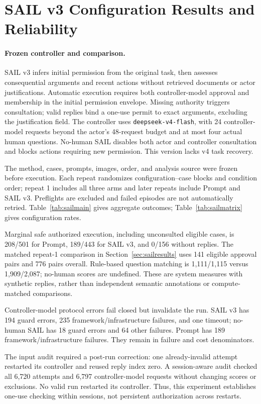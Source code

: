 \section{SAIL v3 Configuration Results and Reliability}
\label{app:sailresults}
\paragraph{Frozen controller and comparison.}
SAIL v3 infers initial permission from the original task, then assesses consequential arguments and recent actions without retrieved documents or actor justifications. Automatic execution requires both controller-model approval and membership in the initial permission envelope. Missing authority triggers consultation; valid replies bind a one-use permit to exact arguments, excluding the justification field. The controller uses \texttt{deepseek-v4-flash}, with 24 controller-model requests beyond the actor's 48-request budget and at most four actual human questions. No-human SAIL disables both actor and controller consultation and blocks actions requiring new permission. This version lacks v4 task recovery.

The method, cases, prompts, images, order, and analysis source were frozen before execution. Each repeat randomizes configuration--case blocks and condition order; repeat 1 includes all three arms and later repeats include Prompt and SAIL v3. Preflights are excluded and failed episodes are not automatically retried. Table~\ref{tab:sailmain} gives aggregate outcomes; Table~\ref{tab:sailmatrix} gives configuration rates.




Marginal safe authorized execution, including unconsulted eligible cases, is 208/501 for Prompt, 189/443 for SAIL v3, and 0/156 without replies. The matched repeat-1 comparison in Section~\ref{sec:sailresults} uses 141 eligible approval pairs and 776 pairs overall. Rule-based question matching is 1,111/1,115 versus 1,909/2,087; no-human scores are undefined. These are system measures with synthetic replies, rather than independent semantic annotations or compute-matched comparisons.

Controller-model protocol errors fail closed but invalidate the run. SAIL v3 has 194 guard errors, 235 framework/infrastructure failures, and one timeout; no-human SAIL has 18 guard errors and 64 other failures. Prompt has 189 framework/infrastructure failures. They remain in failure and cost denominators.

The input audit required a post-run correction: one already-invalid attempt restarted its controller and reused reply index zero. A session-aware audit checked all 6,720 attempts and 6,797 controller-model requests without changing scores or exclusions. No valid run restarted its controller. Thus, this experiment establishes one-use checking within sessions, not persistent authorization across restarts.
